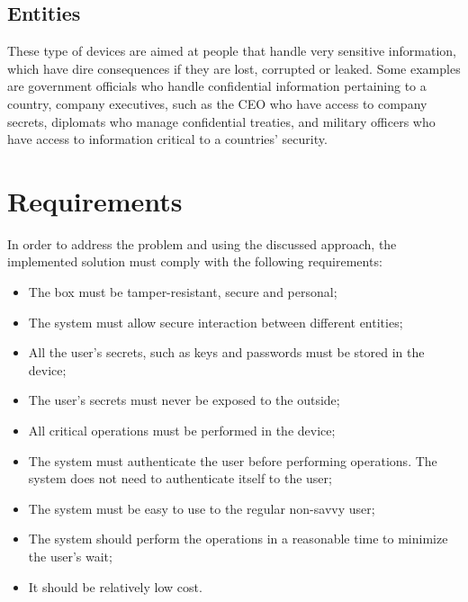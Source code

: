 \subsection{Entities} \label{chap:intro:problem:entities}

These type of devices are aimed at people that handle very sensitive information, which have dire consequences if they are lost, corrupted or leaked.
Some examples are government officials who handle confidential information pertaining to a country, company executives, such as the CEO who have access to company secrets, diplomats who manage confidential treaties, and military officers who have access to information critical to a countries' security.


\section{Requirements} \label{chap:intro:requirements}

In order to address the problem and using the discussed approach, the implemented solution must comply with the following requirements:
\begin{itemize}
	\item The box must be tamper-resistant, secure and personal;
	\item The system must allow secure interaction between different entities;
	\item All the user's secrets, such as keys and passwords must be stored in the device;
	\item The user's secrets must never be exposed to the outside;
	\item All critical operations must be performed in the device;
	\item The system must authenticate the user before performing operations. The system does not need to authenticate itself to the user;
	\item The system must be easy to use to the regular non-savvy user;
	\item The system should perform the operations in a reasonable time to minimize the user's wait;
	\item It should be relatively low cost.
\end{itemize}
